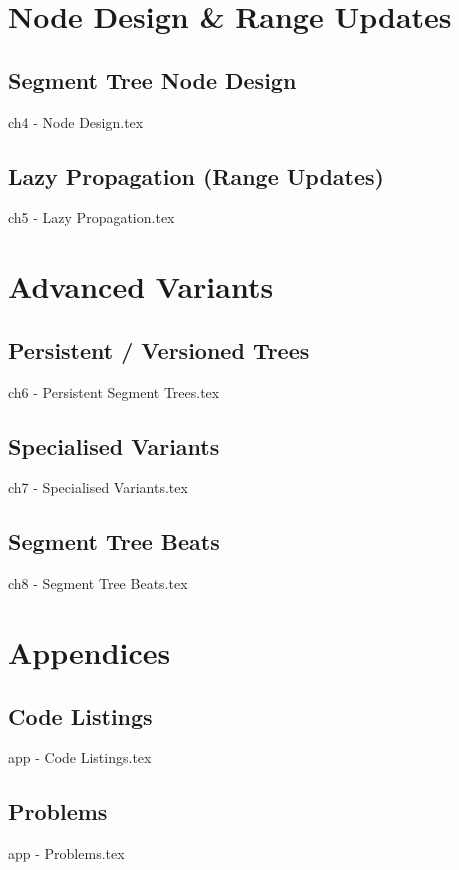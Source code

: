 \documentclass{tufte-book}
\begin{document}
\part{Node Design \& Range Updates}
\chapter{Segment Tree Node Design}
{ch4 - Node Design.tex}
\chapter{Lazy Propagation (Range Updates)}
{ch5 - Lazy Propagation.tex}

\part{Advanced Variants}
\chapter{Persistent / Versioned Trees}
{ch6 - Persistent Segment Trees.tex}
\chapter{Specialised Variants}
{ch7 - Specialised Variants.tex}
\chapter{Segment Tree Beats}
{ch8 - Segment Tree Beats.tex}

\part{Appendices}
\chapter{Code Listings}
{app - Code Listings.tex}
\chapter{Problems}
{app - Problems.tex}

\end{document}
